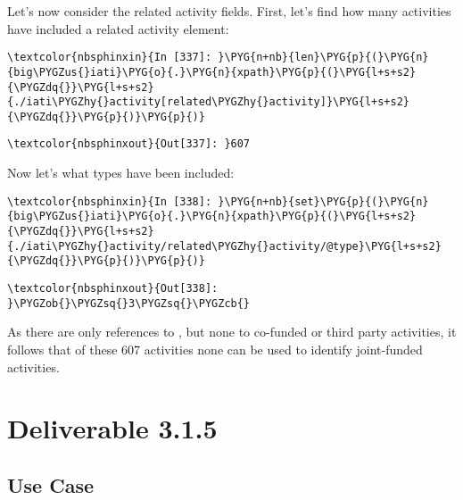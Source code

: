 \documentclass[letterpaper,10pt,english]{sphinxmanual}
\begin{document}
Let's now consider the related activity fields. First, let's find how
many activities have included a related activity element:

\begin{Verbatim}[commandchars=\\\{\}]
\textcolor{nbsphinxin}{In [337]: }\PYG{n+nb}{len}\PYG{p}{(}\PYG{n}{big\PYGZus{}iati}\PYG{o}{.}\PYG{n}{xpath}\PYG{p}{(}\PYG{l+s+s2}{\PYGZdq{}}\PYG{l+s+s2}{./iati\PYGZhy{}activity[related\PYGZhy{}activity]}\PYG{l+s+s2}{\PYGZdq{}}\PYG{p}{)}\PYG{p}{)}
\end{Verbatim}

\begin{Verbatim}[commandchars=\\\{\}]
\textcolor{nbsphinxout}{Out[337]: }607
\end{Verbatim}

Now let's what types have been included:

\begin{Verbatim}[commandchars=\\\{\}]
\textcolor{nbsphinxin}{In [338]: }\PYG{n+nb}{set}\PYG{p}{(}\PYG{n}{big\PYGZus{}iati}\PYG{o}{.}\PYG{n}{xpath}\PYG{p}{(}\PYG{l+s+s2}{\PYGZdq{}}\PYG{l+s+s2}{./iati\PYGZhy{}activity/related\PYGZhy{}activity/@type}\PYG{l+s+s2}{\PYGZdq{}}\PYG{p}{)}\PYG{p}{)}
\end{Verbatim}

\begin{Verbatim}[commandchars=\\\{\}]
\textcolor{nbsphinxout}{Out[338]: }\PYGZob{}\PYGZsq{}3\PYGZsq{}\PYGZcb{}
\end{Verbatim}

As there are only references to ,
but none to co-funded or third party activities, it follows that of
these 607 activities none can be used to identify joint-funded
activities.


\section{Deliverable 3.1.5}
\label{\detokenize{Global Affairs Canada - Compliance Report:Deliverable-3.1.5}}

\subsection{Use Case}
\label{\detokenize{Global Affairs Canada - Compliance Report:Use-Case}}
\end{document}
